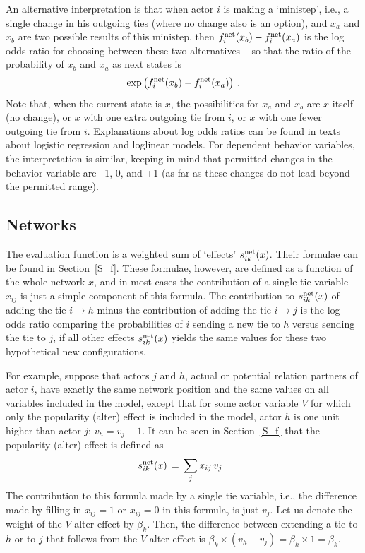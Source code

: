 \documentclass[a4paper,fleqn,11pt]{article}
\newcommand{\+}{\, + \,}
\begin{document}
An alternative interpretation is that when actor $i$ is making
a `ministep', i.e., a single change in his outgoing ties
(where no change also is an option), and
$x_a$ and $x_b$ are two possible results of this ministep,
then $f^{\rm net}_i(x_b) - f^{\rm net}_i(x_a)$ is the log odds ratio
for choosing between these two alternatives -- so that the ratio
of the probability of $x_b$ and $x_a$ as next states is
\[
  \exp\big(f^{\rm net}_i(x_b) - f^{\rm net}_i(x_a)\big) \ .
\]
Note that, when the current state is $x$, the possibilities
for $x_a$ and $x_b$ are $x$ itself (no change), or $x$ with one extra
outgoing tie from $i$, or $x$ with one fewer outgoing tie from $i$.
Explanations about log odds ratios can be found
in texts about logistic regression and loglinear models.
For dependent behavior variables, the interpretation is similar,
keeping in mind that permitted changes in the behavior variable are
--1, 0, and +1 (as far as these changes do not lead beyond the
permitted range).

\subsection{Networks}

The evaluation function is a weighted sum of `effects'
$s^{\rm net}_{ik}(x)$.
Their formulae can be found in Section~\ref{S_f}.
These formulae, however, are defined as a function of the whole
network $x$, and in most cases the contribution of a single tie
variable $x_{ij}$ is just a simple component of this formula.
The contribution to $s^{\rm net}_{ik}(x)$
of adding the tie $i \rightarrow h$ minus the
contribution of adding the tie $i \rightarrow j$ is the log odds ratio
comparing the probabilities of $i$ sending a new tie to $h$ versus
sending the tie to $j$, if all other effects $s^{\rm net}_{ik}(x)$
yields the same values for these two hypothetical new configurations.

For example, suppose that actors $j$ and $h$,
actual or potential relation partners of actor $i$,
have exactly the same network
position and the same values on all variables included in the model,
except that for some actor variable $V$ for which only the
popularity (alter) effect is included in the model,
actor $h$ is one unit higher than actor $j$: $v_h = v_j + 1$.
It can be seen in Section~\ref{S_f} that
the popularity (alter) effect is defined as
\[
s^{\rm net}_{ik}(x) \, = \,  \sum_j x_{ij}\, v_j \ .
\]
The contribution to this formula made by a single tie variable,
i.e., the difference made by filling in $x_{ij} = 1$ or $x_{ij} = 0$
in this formula, is just $v_j$.
Let us denote the weight of the $V$-alter effect by $\beta_k$.
Then, the difference between extending a tie to $h$ or to $j$
that follows from the $V$-alter effect is
$\beta_k \times (v_h - v_j) = \beta_k \times 1 = \beta_k$.
\end{document}
